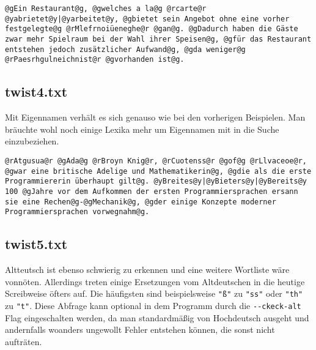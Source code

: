 \documentclass[a4paper,10pt,ngerman]{scrartcl}
\begin{document}
\begin{lstlisting}
@gEin Restaurant@g, @gwelches a la@g @rcarte@r @yabrietet@y|@yarbeitet@y, @gbietet sein Angebot ohne eine vorher festgelegte@g @rMlefrnoiüeneghe@r @gan@g. @gDadurch haben die Gäste zwar mehr Spielraum bei der Wahl ihrer Speisen@g, @gfür das Restaurant entstehen jedoch zusätzlicher Aufwand@g, @gda weniger@g @rPaesrhgulneichnist@r @gvorhanden ist@g.
\end{lstlisting}

\vspace{1\baselineskip}
\subsection{twist4.txt}
Mit Eigennamen verhält es sich genauso wie bei den vorherigen Beispielen. Man bräuchte wohl noch einige Lexika mehr um Eigennamen mit in die Suche einzubeziehen.

\begin{lstlisting}
@rAtgusua@r @gAda@g @rBroyn Knig@r, @rCuotenss@r @gof@g @rLlvaceoe@r, @gwar eine britische Adelige und Mathematikerin@g, @gdie als die erste Programmiererin überhaupt gilt@g. @yBreites@y|@yBieters@y|@yBereits@y 100 @gJahre vor dem Aufkommen der ersten Programmiersprachen ersann sie eine Rechen@g-@gMechanik@g, @gder einige Konzepte moderner Programmiersprachen vorwegnahm@g.
\end{lstlisting}

\vspace{1\baselineskip}
\subsection{twist5.txt}
Altteutsch ist ebenso schwierig zu erkennen und eine weitere Wortliste wäre vonnöten. Allerdings treten einige Ersetzungen vom Altdeutschen in die heutige Screibweise öfters auf. Die häufigsten sind beispielsweise \lstinline{"ß"} zu \lstinline{"ss"} oder \lstinline{"th"} zu \lstinline{"t"}. Diese Abfrage kann optional in dem Programm durch die \lstinline{--ckeck-alt} Flag eingeschalten werden, da man standardmäßig von Hochdeutsch ausgeht und andernfalls woanders ungewollt Fehler entstehen können, die sonst nicht aufträten.
\end{document}
